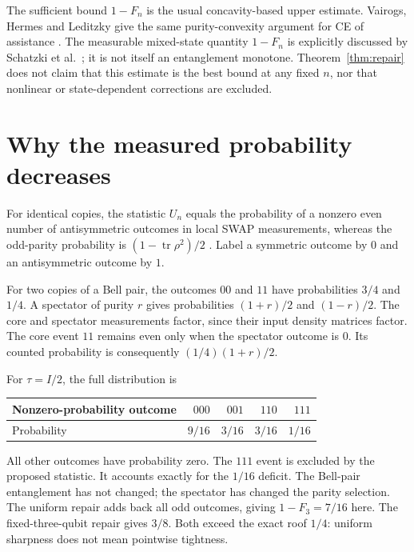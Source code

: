 \documentclass[11pt,a4paper]{article}
\newcommand{\tr}{\operatorname{tr}}
\begin{document}
The sufficient bound $1-F_n$ is the usual concavity-based upper estimate. Vairogs, Hermes and Leditzky give the same purity-convexity argument for CE of assistance \cite[Theorem 3 and Appendix B]{vairogs2026}. The measurable mixed-state quantity $1-F_n$ is explicitly discussed by Schatzki et al.\ \cite[Supplement, Section XI]{schatzki2024}; it is not itself an entanglement monotone. Theorem~\ref{thm:repair} does not claim that this estimate is the best bound at any fixed $n$, nor that nonlinear or state-dependent corrections are excluded.

\section{Why the measured probability decreases}
For identical copies, the statistic $U_n$ equals the probability of a nonzero even number of antisymmetric outcomes in local SWAP measurements, whereas the odd-parity probability is $(1-\tr\rho^2)/2$ \cite[eqs.~(3.3)--(3.4)]{foulds2024}. Label a symmetric outcome by $0$ and an antisymmetric outcome by $1$.

For two copies of a Bell pair, the outcomes $00$ and $11$ have probabilities $3/4$ and $1/4$. A spectator of purity $r$ gives probabilities $(1+r)/2$ and $(1-r)/2$. The core and spectator measurements factor, since their input density matrices factor. The core event $11$ remains even only when the spectator outcome is $0$. Its counted probability is consequently $(1/4)(1+r)/2$.

For $\tau=I/2$, the full distribution is
\begin{center}
\begin{tabular}{@{}lrrrr@{}}
\toprule
Nonzero-probability outcome & $000$ & $001$ & $110$ & $111$\\
\midrule
Probability & $9/16$ & $3/16$ & $3/16$ & $1/16$\\
\bottomrule
\end{tabular}
\end{center}
All other outcomes have probability zero. The $111$ event is excluded by the proposed statistic. It accounts exactly for the $1/16$ deficit. The Bell-pair entanglement has not changed; the spectator has changed the parity selection. The uniform repair adds back all odd outcomes, giving $1-F_3=7/16$ here. The fixed-three-qubit repair gives $3/8$. Both exceed the exact roof $1/4$: uniform sharpness does not mean pointwise tightness.


\end{document}
